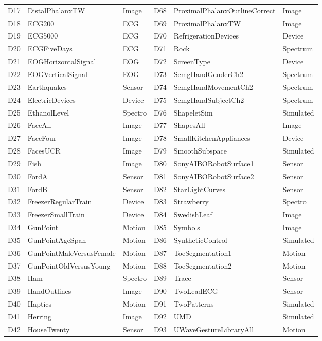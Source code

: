 \begin{table}[H]
\begin{tabular}{lll || lll}
D17 & DistalPhalanxTW & Image & D68 & ProximalPhalanxOutlineCorrect & Image \\
D18 & ECG200 & ECG & D69 & ProximalPhalanxTW & Image \\
D19 & ECG5000 & ECG & D70 & RefrigerationDevices & Device \\
D20 & ECGFiveDays & ECG & D71 & Rock & Spectrum \\
D21 & EOGHorizontalSignal & EOG & D72 & ScreenType & Device \\
D22 & EOGVerticalSignal & EOG & D73 & SemgHandGenderCh2 & Spectrum \\
D23 & Earthquakes & Sensor & D74 & SemgHandMovementCh2 & Spectrum \\
D24 & ElectricDevices & Device & D75 & SemgHandSubjectCh2 & Spectrum \\
D25 & EthanolLevel & Spectro & D76 & ShapeletSim & Simulated \\
D26 & FaceAll & Image & D77 & ShapesAll & Image \\
D27 & FaceFour & Image & D78 & SmallKitchenAppliances & Device \\
D28 & FacesUCR & Image & D79 & SmoothSubspace & Simulated \\
D29 & Fish & Image & D80 & SonyAIBORobotSurface1 & Sensor \\
D30 & FordA & Sensor & D81 & SonyAIBORobotSurface2 & Sensor \\
D31 & FordB & Sensor & D82 & StarLightCurves & Sensor \\
D32 & FreezerRegularTrain & Device & D83 & Strawberry & Spectro \\
D33 & FreezerSmallTrain & Device & D84 & SwedishLeaf & Image \\
D34 & GunPoint & Motion & D85 & Symbols & Image \\
D35 & GunPointAgeSpan & Motion & D86 & SyntheticControl & Simulated \\
D36 & GunPointMaleVersusFemale & Motion & D87 & ToeSegmentation1 & Motion \\
D37 & GunPointOldVersusYoung & Motion & D88 & ToeSegmentation2 & Motion \\
D38 & Ham & Spectro & D89 & Trace & Sensor \\
D39 & HandOutlines & Image & D90 & TwoLeadECG & Sensor \\
D40 & Haptics & Motion & D91 & TwoPatterns & Simulated \\
D41 & Herring & Image & D92 & UMD & Simulated \\
D42 & HouseTwenty & Sensor & D93 & UWaveGestureLibraryAll & Motion \\

\end{tabular}
\end{table}
